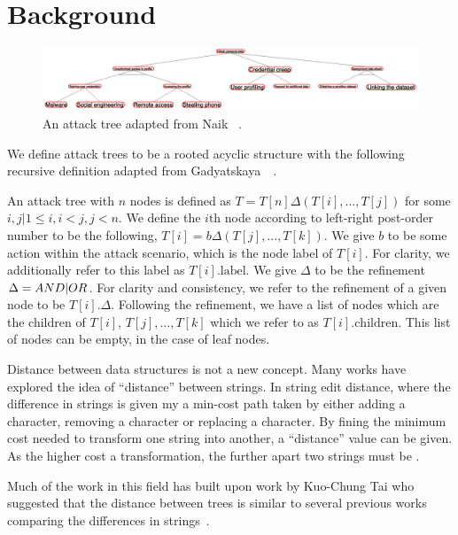 \section{Background}

\begin{figure}
    \includegraphics[width=\linewidth]{img/TargetAT.png}
    \caption{An attack tree adapted from Naik \etal~\cite{naikEvaluationPotentialAttack2022}. }
    \label{fig:tartgetAT}
\end{figure}

We define attack trees to be a rooted acyclic structure with the following recursive definition adapted from Gadyatskaya~\etal~\cite{gadyatskayaRefinementAwareGenerationAttack2017}. 

\begin{definition} \label{def:attack-tree} An attack tree with $n$ nodes is defined as $T = T[n]\Delta(T[i],...,T[j])$ for some $i,j|1 \le i, i < j, j < n$. We define the $i\text{th}$ node according to left-right post-order number to be the following, $T[i] = b\Delta(T[j],...,T[k])$. We give $b$ to be some action within the attack scenario, which is the node label of $T[i]$. For clarity, we additionally refer to this label as $T[i].\text{label}$. We give $\Delta$ to be the refinement $\Delta = AND|OR$. For clarity and consistency, we refer to the refinement of a given node to be $T[i].\Delta$. Following the refinement, we have a list of nodes which are the children of $T[i]$, $T[j],...,T[k]$ which we refer to as $T[i].\text{children}$. This list of nodes can be empty, in the case of leaf nodes.
\end{definition}
      

Distance between data structures is not a new concept. Many works have explored the idea of ``distance'' between strings. In string edit distance, where the difference in strings is given my a min-cost path taken by either adding a character, removing a character or replacing a character. By fining the minimum cost needed to transform one string into another, a ``distance'' value can be given. As the higher cost a transformation, the further apart two strings must be .

Much of the work in this field has built upon work by Kuo-Chung Tai who suggested that the distance between trees is similar to several previous works comparing the differences in strings~\cite{tai_tree--tree_nodate}.


